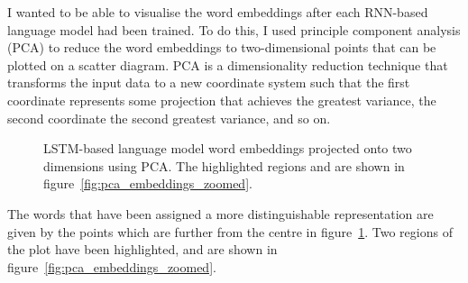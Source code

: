 \documentclass[a4paper, 12pt]{report}
\begin{document}
I wanted to be able to visualise the word embeddings after each RNN-based language model had been trained. To do this, I used principle component analysis (PCA) to reduce the word embeddings to two-dimensional points that can be plotted on a scatter diagram. PCA is a dimensionality reduction technique that transforms the input data to a new coordinate system such that the first coordinate represents some projection that achieves the greatest variance, the second coordinate the second greatest variance, and so on.

\begin{figure}[h]
\captionsetup{justification=centering}
\centering
{}
\caption{LSTM-based language model word embeddings projected onto two dimensions using PCA. The highlighted regions and are shown in figure~\ref{fig:pca_embeddings_zoomed}.}
\label{fig:pca_embeddings_all}
\end{figure}

The words that have been assigned a more distinguishable representation are given by the points which are further from the centre in figure~\ref{fig:pca_embeddings_all}. Two regions of the plot have been highlighted, and are shown in figure~\ref{fig:pca_embeddings_zoomed}.
\end{document}
